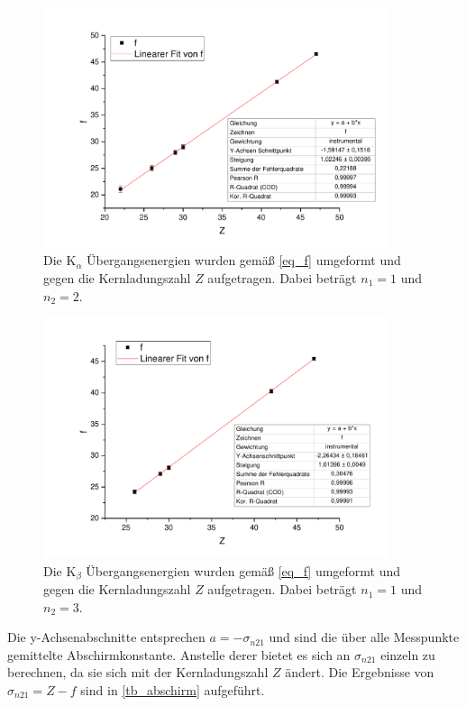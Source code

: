 \documentclass[
	a4paper,
	12pt,
	pagesize,
	ngerman
]{scrartcl}
\begin{document}
	\begin{figure}[H]
		\includegraphics[width=0.9\textwidth]{Ka}
		\centering
		\caption{Die $\text{K}_\alpha$ Übergangsenergien wurden gemäß \cref{eq_f} umgeformt und gegen die Kernladungszahl $Z$ aufgetragen. Dabei beträgt $n_1=1$ und $n_2=2$.}
		\label{fig_Ka}
		\centering
	\end{figure}
	
	\begin{figure}[H]
		\includegraphics[width=0.9\textwidth]{Kb}
		\centering
		\caption{Die $\text{K}_\beta$ Übergangsenergien wurden gemäß \cref{eq_f} umgeformt und gegen die Kernladungszahl $Z$ aufgetragen. Dabei beträgt $n_1=1$ und $n_2=3$.}
			\label{fig_Kb}
			\centering
	\end{figure}
	
	Die y-Achsenabschnitte entsprechen $a=-\sigma_{n21}$ und sind die über alle Messpunkte gemittelte Abschirmkonstante.
	Anstelle derer bietet es sich an $\sigma_{n21}$ einzeln zu berechnen, da sie sich mit der Kernladungszahl $Z$ ändert.
	Die Ergebnisse von $\sigma_{n21}=Z-f$ sind in \cref{tb_abschirm} aufgeführt.
	
\end{document}
